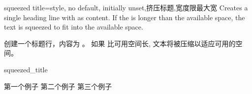 \begin{docTcbKey}[][doc new=2014-11-24]{squeezed title}{=}{style, no default, initially unset,挤压标题,宽度限最大宽}
Creates a single heading line with  as content.
If the  is longer than the available space, the text is
squeezed to fit into the available space.

创建一个标题行，内容为 。%
如果  比可用空间长, 文本将被压缩以适应可用的空间。
\begin{exdispExample}{squeezed_title}
\begin{tcbitemize}[
raster columns=3,%
raster equal height,%
colframe=red!75!black,colback=red!5!white,%
fonttitle=\bfseries%
]
\tcbitem[squeezed title={短标题}]
第一个例子
\tcbitem[squeezed title={这是一个非常非常长的标题}]
第二个例子
\tcbitem[squeezed title={这个标题显然对这个例子来说太长了}]
第三个例子
\end{tcbitemize}
\end{exdispExample}
\end{docTcbKey}








